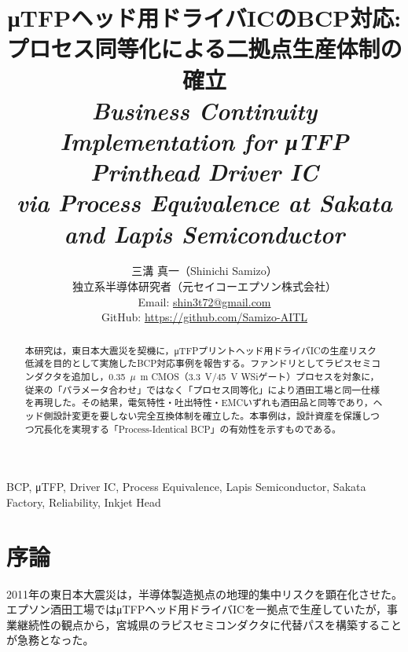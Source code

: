 \documentclass[conference]{IEEEtran}
\newcommand{\micro}{\ensuremath{\mu}}
\begin{document}
\title{%
μTFPヘッド用ドライバICのBCP対応:\\
プロセス同等化による二拠点生産体制の確立\\[2mm]
\textit{Business Continuity Implementation for μTFP Printhead Driver IC\\
via Process Equivalence at Sakata and Lapis Semiconductor}
}

\author{%
三溝 真一（Shinichi Samizo）\\
独立系半導体研究者（元セイコーエプソン株式会社）\\
Email: \href{mailto:shin3t72@gmail.com}{shin3t72@gmail.com} \\
GitHub: \url{https://github.com/Samizo-AITL}
}

\maketitle

\begin{abstract}
本研究は，東日本大震災を契機に，μTFPプリントヘッド用ドライバICの生産リスク低減を目的として実施したBCP対応事例を報告する。ファンドリとしてラピスセミコンダクタを追加し，\SI{0.35}{\micro\meter} CMOS（\SI{3.3}{\volt}/\SI{45}{\volt} WSiゲート）プロセスを対象に，従来の「パラメータ合わせ」ではなく「プロセス同等化」により酒田工場と同一仕様を再現した。その結果，電気特性・吐出特性・EMCいずれも酒田品と同等であり，ヘッド側設計変更を要しない完全互換体制を確立した。本事例は，設計資産を保護しつつ冗長化を実現する「Process-Identical BCP」の有効性を示すものである。
\end{abstract}

\begin{IEEEkeywords}
BCP, μTFP, Driver IC, Process Equivalence, Lapis Semiconductor, Sakata Factory, Reliability, Inkjet Head
\end{IEEEkeywords}

\section{序論}
2011年の東日本大震災は，半導体製造拠点の地理的集中リスクを顕在化させた。エプソン酒田工場ではμTFPヘッド用ドライバICを一拠点で生産していたが，事業継続性の観点から，宮城県のラピスセミコンダクタに代替パスを構築することが急務となった。
\end{document}
